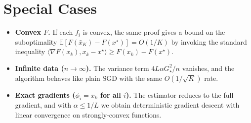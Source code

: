 \documentclass[11pt]{article}
\newcommand{\E}{\mathbb{E}}
\newcommand{\grad}{\nabla}
\begin{document}
\section*{Special Cases}
\begin{itemize}
\item \textbf{Convex $F$.} If each $f_i$ is convex, the same proof gives a bound on the suboptimality $ \E[F(\bar x_K)-F(x^\star)] = O(1/K)$ by invoking the standard inequality $ \langle\grad F(x_k),x_k-x^\star\rangle \ge F(x_k)-F(x^\star)$.
\item \textbf{Infinite data ($n\to\infty$).} The variance term $4L\alpha G_{\star}^{2}/n$ vanishes, and the algorithm behaves like plain SGD with the same $O(1/\sqrt{K})$ rate.
\item \textbf{Exact gradients ($\phi_i = x_k$ for all $i$).} The estimator reduces to the full gradient, and with $\alpha\le 1/L$ we obtain deterministic gradient descent with linear convergence on strongly‑convex functions.
\end{itemize}
\end{document}
